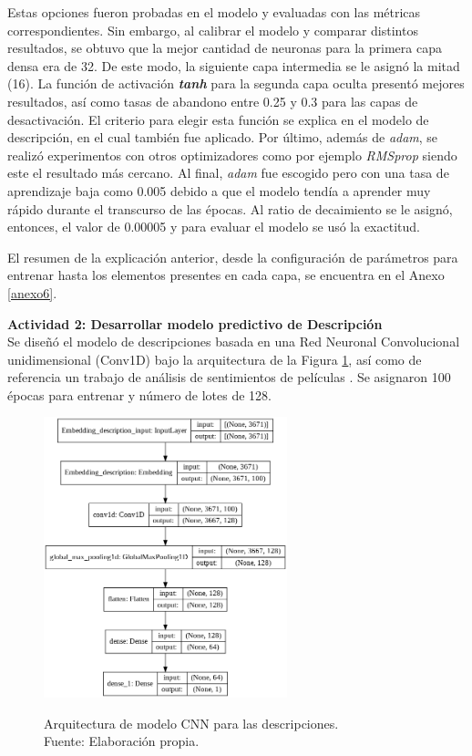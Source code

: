 Estas opciones fueron probadas en el modelo y evaluadas con las métricas correspondientes. Sin embargo, al calibrar el modelo y comparar distintos resultados, se obtuvo que la mejor cantidad de neuronas para la primera capa densa era de 32. De este modo, la siguiente capa intermedia se le asignó la mitad (16). La función de activación \textit{\textbf{tanh}} para la segunda capa oculta presentó mejores resultados, así como tasas de abandono entre 0.25 y 0.3 para las capas de desactivación. El criterio para elegir esta función se explica en el modelo de descripción, en el cual también fue aplicado. Por último, además de \textit{adam}, se realizó experimentos con otros optimizadores como por ejemplo \textit{RMSprop} siendo este el resultado más cercano. Al final, \textit{adam} fue escogido pero con una tasa de aprendizaje baja como 0.005 debido a que el modelo tendía a aprender muy rápido durante el transcurso de las épocas. Al ratio de decaimiento se le asignó, entonces, el valor de 0.00005 y para evaluar el modelo se usó la exactitud.

El resumen de la explicación anterior, desde la configuración de parámetros para entrenar hasta los elementos presentes en cada capa, se encuentra en el Anexo \ref{anexo6}.

\textbf{Actividad 2: Desarrollar modelo predictivo de Descripción}
\\
Se diseñó el modelo de descripciones basada en una Red Neuronal Convolucional unidimensional (Conv1D) bajo la arquitectura de la Figura \ref{4:fig35}, así como de referencia un trabajo de análisis de sentimientos de películas \parencite{tec_malik2019pythonnlp}. Se asignaron 100 épocas para entrenar y número de lotes de 128.

\begin{figure}[!ht]
	\begin{center}
		\includegraphics[width=0.63\textwidth]{4/figures/model_cnn_description.png}
		\caption[Arquitectura de modelo CNN para las descripciones]{Arquitectura de modelo CNN para las descripciones.\\
			Fuente: Elaboración propia.}
		\vspace{-0.5cm}
		\label{4:fig35}
	\end{center}
\end{figure}

